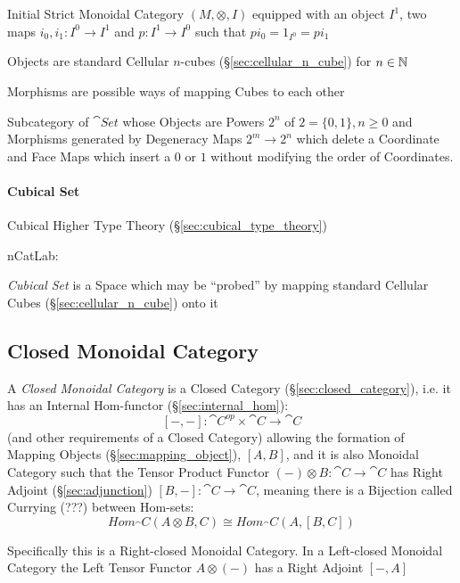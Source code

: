 Initial Strict Monoidal Category $(M, \otimes, I)$ equipped with an
object $I^1$, two maps $i_0, i_1 : I^0 \rightarrow I^1$ and $p : I^1
\rightarrow I^0$ such that $pi_0 = 1_{I^0} = pi_1$

Objects are standard Cellular $n$-cubes (\S\ref{sec:cellular_n_cube})
for $n \in \mathbb{N}$

Morphisms are possible ways of mapping Cubes to each other

Subcategory of $\cat{Set}$ whose Objects are Powers $2^n$ of $2 =
\{0,1\}, n \geq 0$ and Morphisms generated by Degeneracy Maps $2^m
\rightarrow 2^n$ which delete a Coordinate and Face Maps which insert
a $0$ or $1$ without modifying the order of Coordinates. %



\paragraph{Cubical Set}\label{sec:cubical_set}\hfill

Cubical Higher Type Theory (\S\ref{sec:cubical_type_theory})

nCatLab:

\emph{Cubical Set} is a Space which may be ``probed'' by mapping
standard Cellular Cubes (\S\ref{sec:cellular_n_cube}) onto it



\subsection{Closed Monoidal Category}\label{sec:closed_monoidal}

A \emph{Closed Monoidal Category} is a Closed Category
(\S\ref{sec:closed_category}), i.e. it has an Internal Hom-functor
(\S\ref{sec:internal_hom}):
\[
  [-,-] : \cat{C}^{op} \times \cat{C} \rightarrow \cat{C}
\]
(and other requirements of a Closed Category) allowing the formation
of Mapping Objects (\S\ref{sec:mapping_object}), $[A,B]$,
and it is also Monoidal Category such that the Tensor Product Functor
$(-) \otimes B : \cat{C} \rightarrow \cat{C}$ has Right Adjoint
(\S\ref{sec:adjunction}) $[B,-] : \cat{C} \rightarrow \cat{C}$,
meaning there is a Bijection called Currying (???) between Hom-sets:
\[
  Hom_\cat{C}(A \otimes B,C) \cong Hom_\cat{C}(A, [B,C])
\]

Specifically this is a Right-closed Monoidal Category. In a
Left-closed Monoidal Category the Left Tensor Functor $A \otimes (-)$
has a Right Adjoint $[-,A]$

